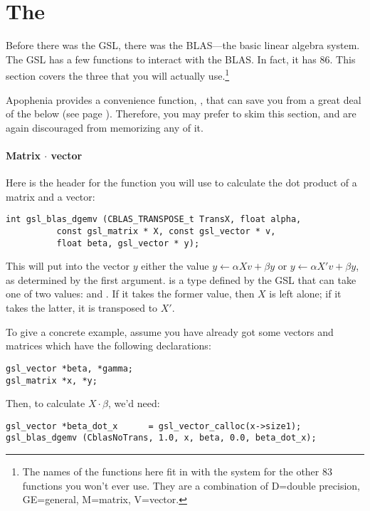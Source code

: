 \section{The } 
 
Before there was the GSL, there was the BLAS---the basic linear algebra
system. The GSL has a few functions to interact with the BLAS. In fact,
it has 86. This section covers the three that you will actually 
use.\footnote{The names of the functions here fit in with the system
for the other 83 functions you won't ever use. They are a combination
of D=double precision, GE=general, M=matrix, V=vector.}

Apophenia provides a convenience function, , that can
save you from a great deal of the below (see page \pageref{apopdot}).
Therefore, you may prefer to skim this section, and are again
discouraged from memorizing any of it.

\paragraph{Matrix $\cdot$ vector} Here is the header for the function you will use to calculate the dot product of a
matrix and a vector:
\begin{lstlisting}
int gsl_blas_dgemv (CBLAS_TRANSPOSE_t TransX, float alpha, 
          const gsl_matrix * X, const gsl_vector * v, 
          float beta, gsl_vector * y);
\end{lstlisting}

This will put into the vector $y$ either the value 
$y \leftarrow \alpha X v + \beta y$ or $y \leftarrow \alpha X' v + \beta y$, as determined by the
first argument.
 is a type defined by the GSL that can take
one of two values:  and . If
it takes the former value, then $X$ is left alone;
if it takes the latter, it is transposed to $X'$.

To give a concrete example, assume you have already got some vectors and matrices which have the following
declarations:
\begin{lstlisting}
gsl_vector *beta, *gamma;     
gsl_matrix *x, *y;           
\end{lstlisting}

Then, to calculate $X\cdot \beta$, we'd need:

\begin{lstlisting}
gsl_vector *beta_dot_x      = gsl_vector_calloc(x->size1);
gsl_blas_dgemv (CblasNoTrans, 1.0, x, beta, 0.0, beta_dot_x);
\end{lstlisting}

